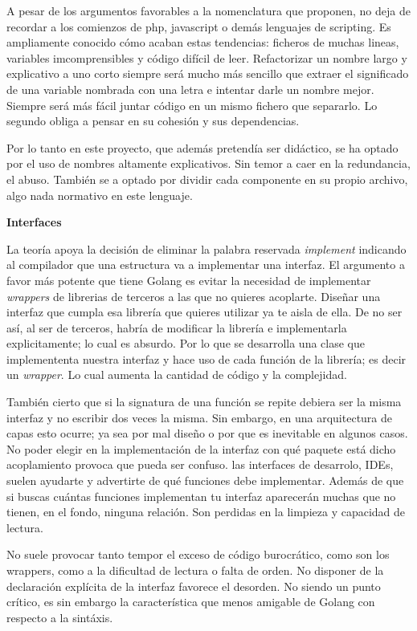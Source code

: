 A pesar de los argumentos favorables a la nomenclatura que proponen, no deja de recordar a los comienzos de php, javascript o demás lenguajes de scripting. Es ampliamente conocido cómo acaban estas tendencias: ficheros de muchas lineas, variables imcomprensibles y código difícil de leer. Refactorizar un nombre largo y explicativo a uno corto siempre será mucho más sencillo que extraer el significado de una variable nombrada con una letra e intentar darle un nombre mejor. Siempre será más fácil juntar código en un mismo fichero que separarlo. Lo segundo obliga a pensar en su cohesión y sus dependencias.

Por lo tanto en este proyecto, que además pretendía ser didáctico, se ha optado por el uso de nombres altamente explicativos. Sin temor a caer en la redundancia, el abuso. También se a optado por dividir cada componente en su propio archivo, algo nada normativo en este lenguaje.

\textbf{Interfaces}

La teoría apoya la decisión de eliminar la palabra reservada \textit{implement} indicando al compilador que una estructura va a implementar una interfaz. El argumento a favor más potente que tiene Golang es evitar la necesidad de implementar \textit{wrappers} de librerias de terceros a las que no quieres acoplarte. Diseñar una interfaz que cumpla esa librería que quieres utilizar ya te aisla de ella. De no ser así, al ser de terceros, habría de modificar la librería e implementarla explicitamente; lo cual es absurdo. Por lo que se desarrolla una clase que implemententa nuestra interfaz y hace uso de cada función de la librería; es decir un \textit{wrapper}. Lo cual aumenta la cantidad de código y la complejidad.

También cierto que si la signatura de una función se repite debiera ser la misma interfaz y no escribir dos veces la misma. Sin embargo, en una arquitectura de capas esto ocurre; ya sea por mal diseño o por que es inevitable en algunos casos. No poder elegir en la implementación de la interfaz con qué paquete está dicho acoplamiento provoca que pueda ser confuso. las interfaces de desarrolo, IDEs, suelen ayudarte y advertirte de qué funciones debe implementar. Además de que si buscas cuántas funciones implementan tu interfaz aparecerán muchas que no tienen, en el fondo, ninguna relación. Son perdidas en la limpieza y capacidad de lectura.

No suele provocar tanto tempor el exceso de código burocrático, como son los wrappers, como a la dificultad de lectura o falta de orden. No disponer de la declaración explícita de la interfaz favorece el desorden. No siendo un punto crítico, es sin embargo la característica que menos amigable de Golang con respecto a la sintáxis.

